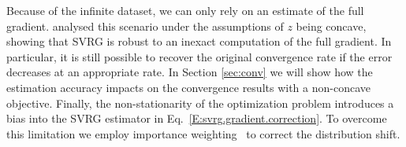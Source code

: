 \documentclass{article}
\makeatletter
\theoremstyle{remark}
\theoremstyle{definition}
\DeclareRobustCommand{\eg}{e.g.,\@\xspace}
\makeatother
\begin{document}
Because of the infinite dataset, we can only rely on an estimate of the full gradient.
\citet{harikandeh2015stopwasting} analysed this scenario under the assumptions of $z$ being concave, showing that SVRG is robust to an inexact computation of the full gradient. In particular, it is still possible to recover the original convergence rate if the error decreases at an appropriate rate. In Section \ref{sec:conv} we will show how the estimation accuracy impacts on the convergence results with a non-concave objective.
Finally, the non-stationarity of the optimization problem introduces a bias into the SVRG estimator in Eq.~\eqref{E:svrg.gradient.correction}.
To overcome this limitation we employ importance weighting~\citep[\eg][]{rubinstein1981simulation,precup2000eligibility} to correct the distribution shift.
\end{document}
